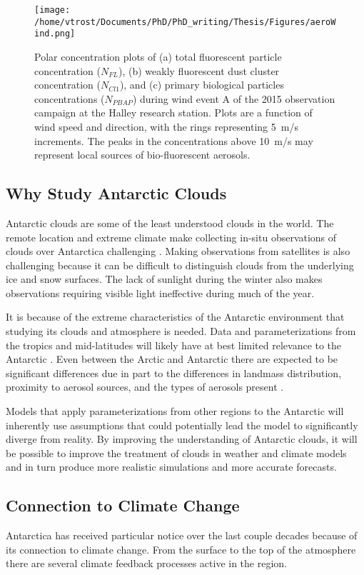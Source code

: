 \begin{figure}[H]
	\centering
	\texttt{[image: /home/vtrost/Documents/PhD/PhD\_writing/Thesis/Figures/aeroWind.png]}
	\caption{Polar concentration plots of (a) total fluorescent particle concentration ($N_{FL}$), (b) weakly fluorescent dust cluster concentration ($N_{Cl1}$), and (c) primary biological particles concentrations ($N_{PBAP}$) during wind event A of the 2015 observation campaign at the Halley research station. Plots are a function of wind speed and direction, with the rings representing \SI{5}{m/s} increments. The peaks in the concentrations above \SI{10}{m/s} may represent local sources of bio-fluorescent aerosols. \citep[][Figure 4]{craw2017}}
	\label{fig:aeroWind}
\end{figure}

\subsection{Why Study Antarctic Clouds}
Antarctic clouds are some of the least understood clouds in the world. The remote location and extreme climate make collecting in-situ observations of clouds over Antarctica challenging \citep{laws2014}. Making observations from satellites is also challenging because it can be difficult to distinguish clouds from the underlying ice and snow surfaces. The lack of sunlight during the winter also makes observations requiring visible light ineffective during much of the year. \citep{lach2010}

It is because of the extreme characteristics of the Antarctic environment that studying its clouds and atmosphere is needed. Data and parameterizations from the tropics and mid-latitudes will likely have at best limited relevance to the Antarctic \citep{lach2010}. Even between the Arctic and Antarctic there are expected to be significant differences due in part to the differences in landmass distribution, proximity to aerosol sources, and the types of aerosols present \citep{lach2010, brom2012}. 

Models that apply parameterizations from other regions to the Antarctic will inherently use assumptions that could potentially lead the model to significantly diverge from reality. By improving the understanding of Antarctic clouds, it will be possible to improve the treatment of clouds in weather and climate models and in turn produce more realistic simulations and more accurate forecasts.

\subsection{Connection to Climate Change}
Antarctica has received particular notice over the last couple decades because of its connection to climate change. From the surface to the top of the atmosphere there are several climate feedback processes active in the region.

